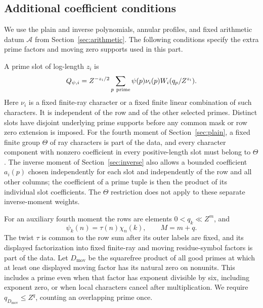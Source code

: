 \documentclass[11pt,a4paper]{article}
\numberwithin{equation}{section}
\numberwithin{figure}{section}
\theoremstyle{definition}
\theoremstyle{remark}
\begin{document}
\subsection{Additional coefficient conditions}

We use the plain and inverse polynomials, annular profiles, and fixed arithmetic
datum $\mathcal A$ from Section~\ref{sec:arithmetic}.  The following conditions
specify the extra prime factors and moving zero supports used in this part.

A prime slot of log-length $z_i$ is
\begin{equation}
 Q_{\psi,i}=Z^{-z_i/2}\sum_{p\ {\rm prime}}
       \psi(p)\nu_i(p)W_i(q_p/Z^{z_i}).
 \label{old-eq:1.2}
\end{equation}
Here $\nu_i$ is a fixed finite-ray character or a fixed finite linear
combination of such characters.  It is independent of the row and of the
other selected primes.  Distinct slots have disjoint underlying prime
supports before any common mask or row zero extension is imposed.  For the
fourth moment of Section~\ref{sec:plain}, a fixed finite group $\Theta$ of
ray characters is part of the data, and every character component with
nonzero coefficient in every positive-length slot must belong to $\Theta$.
The inverse moment of Section~\ref{sec:inverse} also allows a bounded
coefficient $a_i(p)$ chosen independently for each slot and independently
of the row and all other columns; the coefficient of a prime tuple is then
the product of its individual slot coefficients.  The $\Theta$ restriction
does not apply to these separate inverse-moment weights.

For an auxiliary fourth moment the rows are elements $0<q_k\ll Z^m$, and
\begin{equation}
 \psi_k(n)=\tau(n)\chi_n(k),\qquad M=m+q.
 \label{old-eq:1.3}
\end{equation}
The twist $\tau$ is common to the row sum after its outer labels are fixed,
and its displayed factorization into fixed finite-ray and moving
residue-symbol factors is part of the data.  Let $D_{\mathrm{mov}}$ be the
squarefree product of all good primes at which at least one displayed moving
factor has its natural zero on nonunits.  This includes a prime even when
that factor has exponent divisible by six, including exponent zero, or when
local characters cancel after multiplication.  We require
$q_{D_{\mathrm{mov}}}\le Z^q$, counting an overlapping prime once.
\end{document}
